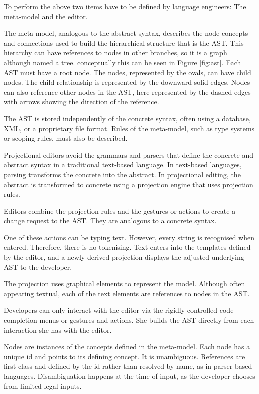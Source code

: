 To perform the above two items have to be defined by language engineers: The meta-model and the editor.

The meta-model, analogous to the abstract syntax, describes the node concepts and connections used to build the hierarchical structure that is the AST.
This hierarchy can have references to nodes in other branches, so it is a graph although named a tree. 
conceptually this can be seen in Figure \ref{fig:ast}.
Each AST must have a root node. 
The nodes, represented by the ovals, can have child nodes.
The child relationship is represented by the downward solid edges.
Nodes can also reference other nodes in the AST, here represented by the dashed edges with arrows showing the direction of the reference.

The AST is stored independently of the concrete syntax, often using a database, XML, or a proprietary file format.
Rules of the meta-model, such as type systems or scoping rules, must also be described.

Projectional editors avoid the grammars and parsers that define the concrete and abstract syntax in a traditional text-based language.
In text-based languages, parsing transforms the concrete into the abstract.
In projectional editing, the abstract is transformed to concrete using a projection engine that uses projection rules.

Editors combine the projection rules and the gestures or actions to create a change request to the AST.
They are analogous to a concrete syntax.

One of these actions can be typing text. 
However, every string is recognised when entered.
Therefore, there is no tokenising.
Text enters into the templates defined by the editor, and a newly derived projection displays the adjusted underlying AST to the developer.

The projection uses graphical elements to represent the model.
Although often appearing textual, each of the text elements are references to nodes in the AST.

Developers can only interact with the editor via the rigidly controlled code completion menus or gestures and actions.
She builds the AST directly from each interaction she has with the editor.

Nodes are instances of the concepts defined in the meta-model.
Each node has a unique id and points to its defining concept.
It is unambiguous.
References are first-class and defined by the id rather than resolved by name, as in parser-based languages.
Disambiguation happens at the time of input, as the developer chooses from limited legal inputs.

